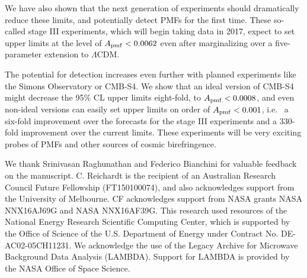\documentclass[apj]{emulateapj}
\newcommand{\apmf}{\ensuremath{A_{\rm pmf}}}
\newcommand{\lcdm}{\ensuremath{\Lambda}CDM}
\begin{document}
We have also shown that the next generation of experiments should dramatically reduce these limits, and potentially detect PMFs for the first time. 
These so-called stage III experiments, which will begin taking data in 2017, expect to set upper limits at the level of $\apmf < 0.0062$ even after marginalizing over a five-parameter extension to \lcdm.

The potential for detection increases even further with planned experiments like the Simons Observatory or CMB-S4. 
We show that an ideal version of CMB-S4 might decrease the 95\% CL upper limits eight-fold, to $\apmf < 0.0008$, and even non-ideal versions can easily set upper limits on order of $\apmf < 0.001$, i.e.~ a six-fold improvement over the forecasts for the stage III experiments and a 330-fold improvement over the current limits. 
These experiments will be very exciting probes of PMFs and other sources of cosmic birefringence. 

\acknowledgments

We thank Srinivasan Raghunathan and Federico Bianchini for valuable feedback on the manuscript. 
C. Reichardt is the recipient of an Australian Research Council Future Fellowship (FT150100074), and also acknowledges support from the University of Melbourne. 
CF acknowledges support from NASA grants NASA NNX16AJ69G and NASA NNX16AF39G. 
This research used resources of the National Energy Research Scientific Computing Center, which is supported by the Office of Science of the U.S. Department of Energy under Contract No. DE-AC02-05CH11231. 
We acknowledge the use of the Legacy Archive for Microwave Background Data Analysis (LAMBDA). Support for LAMBDA is provided by the NASA Office of Space Science.



\end{document}
